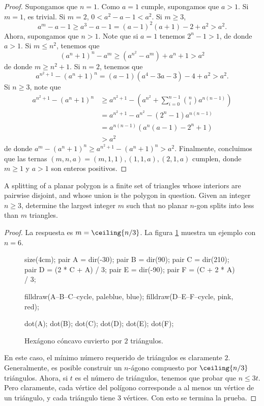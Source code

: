 \begin{proof}
	Supongamos que $n=1$. Como $a=1$ cumple, supongamos que $a>1$. Si $m=1$, es trivial. Si $m=2$, $0<a^2-a-1<a^2$. Si $m\ge 3$,
	\[a^m-a-1\ge a^3-a-1=(a-1)^2(a+1)-2+a^2>a^2.\]
	Ahora, supongamos que $n>1$. Note que si $a=1$ tenemos $2^n-1>1$, de donde $a>1$. Si $m\le n^2$, tenemos que
	\[(a^n+1)^n-a^m\ge \left(a^{n^2}-a^m\right)+a^n+1>a^2\]
	de donde $m\ge n^2+1$. Si $n=2$, tenemos que
	\[a^{n^2+1}-(a^n+1)^n=(a-1)(a^4-3a-3)-4+a^2>a^2.\]
	Si $n\ge 3$, note que
	\begin{align*}
		a^{n^2+1}-(a^n+1)^n
		&\ge a^{n^2+1}-\left(a^{n^2}+\sum_{i=0}^{n-1}\binom{n}{i}a^{n(n-1)}\right)\\
		&=a^{n^2+1}-a^{n^2}-(2^n-1)a^{n(n-1)}\\
		&=a^{n(n-1)}\left(a^n(a-1)-2^n+1\right)\\
		&>a^2
	\end{align*}
	de donde $a^m-(a^n+1)^n\ge a^{n^2+1}-(a^n+1)^n>a^2$. Finalmente, concluimos que las ternas $(m,n,a)=(m,1,1),(1,1,a),(2,1,a)$ cumplen, donde $m\ge 1$ y $a>1$ son enteros positivos.
\end{proof}

\begin{probEG}
	A splitting of a planar polygon is a finite set of triangles whose interiors are pairwise disjoint, and whose union is the polygon in question. Given an integer $n\ge 3$, determine the largest integer $m$ such that no planar $n$-gon splits into less than $m$ triangles.
\end{probEG}

\begin{proof}
	La respuesta es $m=\ceiling{n/3}$. La figura \ref{fig:splitting_hexagon} muestra un ejemplo con $n=6$.

	\begin{figure}[ht!]
		\centering
		\begin{asy}
			size(4cm);
			pair A = dir(-30);
			pair B = dir(90);
			pair C = dir(210);
			pair D = (2 * C + A) / 3;
			pair E = dir(-90);
			pair F = (C + 2 * A) / 3;

			filldraw(A--B--C--cycle, paleblue, blue);
			filldraw(D--E--F--cycle, pink, red);

			dot(A);
			dot(B);
			dot(C);
			dot(D);
			dot(E);
			dot(F);
		\end{asy}
		\caption{Hexágono cóncavo cuvierto por $2$ triángulos.}
		\label{fig:splitting_hexagon}
	\end{figure}

	En este caso, el mínimo número requerido de triángulos es claramente $2$. Generalmente, es posible construir un $n$-ágono compuesto por $\ceiling{n/3}$ triángulos. Ahora, si $t$ es el número de triángulos, tenemos que probar que $n\le 3t$. Pero claramente, cada vértice del polígono corresponde a al menos un vértice de un triángulo, y cada triángulo tiene $3$ vértices. Con esto se termina la prueba.
\end{proof}

